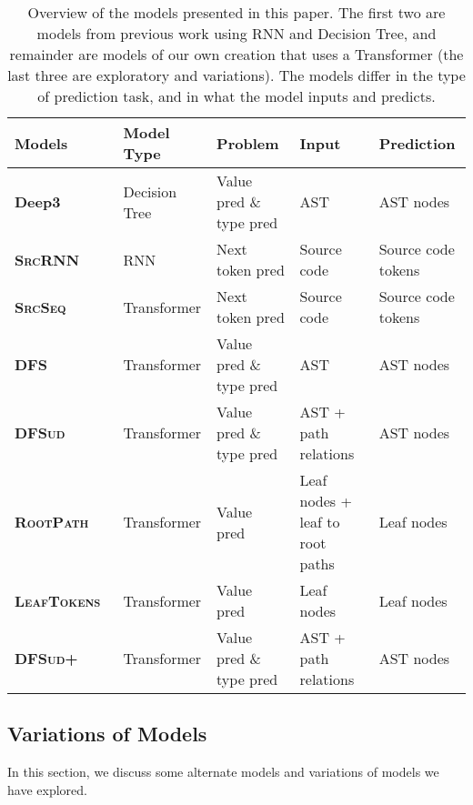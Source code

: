 \documentclass[nonacm, sigconf]{acmart}
\newcommand{\abbr}[1]{\textsc{#1}~}
\newcommand{\SrcSeq}{\abbr{SrcSeq}} \newcommand{\SrcRNN}{\abbr{SrcRNN}} \newcommand{\LeafSeq}{\abbr{LeafSeq}} \newcommand{\RootPath}{\abbr{RootPath}} \newcommand{\LeafTokens}{\abbr{LeafTokens}} \newcommand{\DFS}{\abbr{DFS}} \newcommand{\TreeRel}{\abbr{DFS{ud}}} \newcommand{\TreeReli}{\abbr{DFS{ud+}}}
\begin{document}
\begin{table*}[]
\centering
\begin{tabular}{|l|l|l|l|l|}
\hline
\textbf{Models}   & \textbf{Model Type} & \textbf{Problem} & \textbf{Input}                   & \textbf{Prediction} \\  \hline
\textbf{Deep3}      & Decision Tree       & Value pred \& type pred & AST                              & AST nodes           \\ 
\textbf{\SrcRNN}   & RNN                 & Next token pred & Source code                      & Source code tokens  \\ 
\hline 
\textbf{\SrcSeq}   & Transformer        & Next token pred & Source code                      & Source code tokens  \\ 

\textbf{\DFS}      & Transformer        & Value pred \& type pred & AST                              & AST nodes           \\ 
\textbf{\TreeRel}  & Transformer        & Value pred \& type pred & AST + path relations             & AST nodes          \\ 
\hline 

\textbf{\RootPath} & Transformer         & Value pred & Leaf nodes + leaf to root paths & Leaf nodes         \\ 
\textbf{\LeafTokens}      & Transformer        & Value pred  & Leaf nodes & Leaf nodes           \\ 
\textbf{\TreeReli}  & Transformer        & Value pred \& type pred & AST + path relations             & AST nodes          \\ 


\hline
\end{tabular}
\caption{Overview of the models presented in this paper. The first two are models from previous work using RNN and Decision Tree, and remainder are models of our own creation that uses a Transformer (the last three are exploratory and variations). The models differ in the type of prediction task, and in what the model inputs and predicts.}
\label{tab:model_overview}
\end{table*}



\subsection{Variations of Models}
In this section, we discuss some alternate models and variations of models we have explored. 
\end{document}
